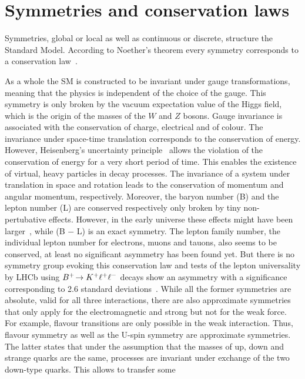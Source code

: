 
\section{Symmetries and conservation laws}
\label{sec:standardmodel:symmetries}

Symmetries, global or local as well as continuous or discrete, structure the
Standard Model. According to Noether's theorem every symmetry corresponds to a
conservation law~\cite{Noether}.

As a whole the SM is constructed to be invariant under gauge transformations,
meaning that the physics is independent of the choice of the gauge. This
symmetry is only broken by the vacuum expectation value of the Higgs field,
which is the origin of the masses of the $W$ and $Z$ bosons. Gauge invariance
is associated with the conservation of charge, electrical and of colour. The
invariance under space-time translation corresponds to the conservation of
energy. However, Heisenberg's uncertainty principle~\cite{Heisenberg:1927zz}
allows the violation of the conservation of energy for a very short period of
time. This enables the existence of virtual, heavy particles in decay
processes. The invariance of a system under translation in space and rotation
leads to the conservation of momentum and angular momentum, respectively.
Moreover, the baryon number (B) and the lepton number (L) are conserved
respectively only broken by tiny non-pertubative effects. However, in the
early universe these effects might have been larger~\cite{Rubakov:1996vz},
while (B $-$ L) is an exact symmetry. The lepton family number, \ie the
individual lepton number for electrons, muons and tauons, also seems to be
conserved, at least no significant asymmetry has been found yet. But there is
no symmetry group evoking this conservation law and tests of the lepton
universality by LHCb using \mbox{${{B}^+}\!\rightarrow {\ensuremath{{K}^+}}\ell^+\ell^-$} decays show an
asymmetry with a significance corresponding to \num{2.6} standard
deviations~\cite{LHCb-PAPER-2014-024}. While all the former symmetries are
absolute, \ie valid for all three interactions, there are also approximate
symmetries that only apply for the electromagnetic and strong but not for the
weak force. For example, flavour transitions are only possible in the weak
interaction. Thus, flavour symmetry as well as the U-spin symmetry are
approximate symmetries. The latter states that under the assumption that the
masses of up, down and strange quarks are the same, processes are invariant
under exchange of the two down-type quarks. This allows to transfer some
